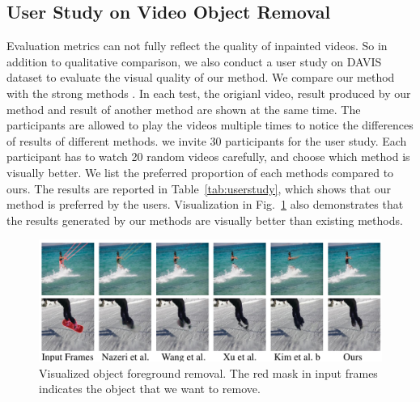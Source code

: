 \subsection{User Study on Video Object Removal}
Evaluation metrics can not fully reflect the quality of inpainted videos. So in addition to qualitative comparison, we also conduct a user study on DAVIS dataset to evaluate the visual quality of our method. We compare our method with the strong methods \cite{nazeri2019edgeconnect,wang2019video,Kim_2019_CVPR1,Xu_2019_CVPR}.
In each test, the origianl video, result produced by our method and result of another method are shown at the same time. The participants are allowed to play the videos multiple times to notice the differences of results of different methods.
we invite 30 participants for the user study. Each participant has to watch 20 random videos carefully, and choose which method is visually better. We list the preferred proportion of each methods compared to ours. The results are reported in Table~\ref{tab:userstudy}, which shows that our method is preferred by the users. Visualization in Fig.~\ref{vis_forg} also demonstrates that the results generated by our methods are visually better than existing methods.
\begin{table}[h]
	\caption{The result of user study.}\smallskip
	\tiny
	\centering
	\label{tab:userstudy}
\end{table}


\begin{figure}[t]
	\centering
	\includegraphics[width=1.0\columnwidth]{vis_forg} %
	\caption{Visualized object foreground removal. The red mask in input frames indicates the object that we want to remove.}
	\label{vis_forg}
\end{figure}



